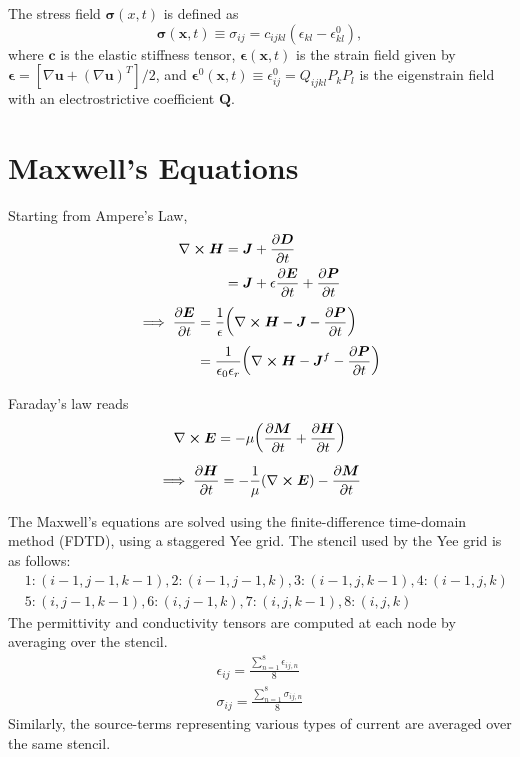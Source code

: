 \documentclass[]{article}
\begin{document}
		The stress field $\bm{\sigma}(x, t)$ is defined as
		\begin{equation}
			\bm{\sigma}(\bm{x}, t) \equiv \sigma_{ij} = c_{ijkl}(\epsilon_{kl} - \epsilon_{kl}^{0}),
		\end{equation}
		where $\bm{c}$ is the elastic stiffness tensor, $\bm{\epsilon}(\textbf{x}, t)$ is the strain field given by $\bm{\epsilon} = [\nabla\bm{u}+(\nabla\bm{u})^{T}]/2$, and $\bm{\epsilon}^{0}(\bm{x}, t)\equiv \epsilon_{ij}^{0} = Q_{ijkl}P_{k}P_{l}$ is the eigenstrain field with an electrostrictive coefficient $\bm{Q}$. 
		\newpage 
		
		\section*{Maxwell's Equations}
		Starting from Ampere's Law,
		\begin{align} \label{eq:ampere}
			\nabla\cross\bm{H} &= \bm{J} + \pdv{\bm{D}}{t} \nonumber\\
			&= \bm{J} + \epsilon\pdv{\bm{E}}{t} + \pdv{\bm{P}}{t}
		\end{align}
		\begin{align} \label{eq:ampere2}
			\implies \pdv{\bm{E}}{t} &= \frac{1}{\epsilon}\bigg(\nabla\cross\bm{H} - \bm{J} - \pdv{\bm{P}}{t}\bigg) \nonumber \\
				&= \frac{1}{\epsilon_{0}\epsilon_{r}}\bigg(\nabla\cross\bm{H} - \bm{J}^{f}-\pdv{\bm{P}}{t}\bigg)
		\end{align}
		
		Faraday's law reads
		\begin{equation} \label{eq:faraday}
			\nabla\cross\bm{E} = -\mu\bigg(\pdv{\bm{M}}{t} + \pdv{\bm{H}}{t}\bigg)
		\end{equation}
		\begin{equation} \label{eq:faraday2}
			\implies\pdv{\bm{H}}{t} = -\frac{1}{\mu}(\nabla\cross\bm{E}) - \pdv{\bm{M}}{t}
		\end{equation}
		
		The Maxwell's equations are solved using the finite-difference time-domain method (FDTD), using a staggered Yee grid. The stencil used by the Yee grid is as follows:
		\begin{align*}
			& 1: (i-1, j-1, k-1), 2: (i-1, j-1, k), 3: (i-1, j, k-1), 4: (i-1, j, k) \\
			& 5: (i, j-1, k-1), 6: (i, j-1, k), 7: (i, j, k-1), 8: (i, j, k)
		\end{align*}
		The permittivity and conductivity tensors are computed at each node by averaging over the stencil.
		\begin{align*}
			\epsilon_{ij} = \frac{\sum_{n = 1}^{8} \epsilon_{ij, n}}{8} \\
			\sigma_{ij} = \frac{\sum_{n = 1}^{8} \sigma_{ij, n}}{8} 
		\end{align*}
		Similarly, the source-terms representing various types of current are averaged over the same stencil.
		
\end{document}
